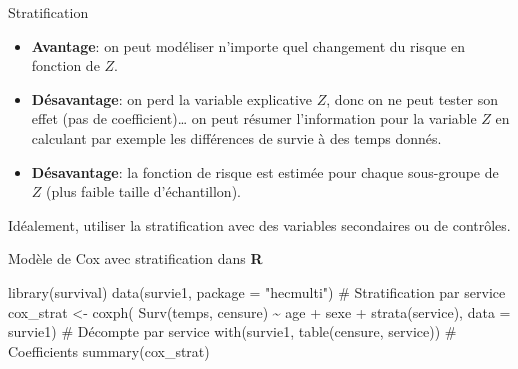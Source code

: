 \documentclass[
  ignorenonframetext,
]{beamer}
\newenvironment{Shaded}{\begin{snugshade}}{\end{snugshade}}
\newcommand{\AttributeTok}[1]{\textcolor[rgb]{0.40,0.45,0.13}{#1}}
\newcommand{\CommentTok}[1]{\textcolor[rgb]{0.37,0.37,0.37}{#1}}
\newcommand{\FunctionTok}[1]{\textcolor[rgb]{0.28,0.35,0.67}{#1}}
\newcommand{\NormalTok}[1]{\textcolor[rgb]{0.00,0.23,0.31}{#1}}
\newcommand{\OtherTok}[1]{\textcolor[rgb]{0.00,0.23,0.31}{#1}}
\newcommand{\SpecialCharTok}[1]{\textcolor[rgb]{0.37,0.37,0.37}{#1}}
\newcommand{\StringTok}[1]{\textcolor[rgb]{0.13,0.47,0.30}{#1}}
\providecommand{\tightlist}{%
  \setlength{\itemsep}{0pt}\setlength{\parskip}{0pt}}
\begin{document}
\begin{frame}{Stratification}
\protect{}\label{stratification}
\begin{itemize}
\tightlist
\item
  \textbf{Avantage}: on peut modéliser n'importe quel changement du
  risque en fonction de \(Z\).
\item
  \textbf{Désavantage}: on perd la variable explicative \(Z\), donc on
  ne peut tester son effet (pas de coefficient)\ldots{} on peut résumer
  l'information pour la variable \(Z\) en calculant par exemple les
  différences de survie à des temps donnés.
\item
  \textbf{Désavantage}: la fonction de risque est estimée pour chaque
  sous-groupe de \(Z\) (plus faible taille d'échantillon).
\end{itemize}

Idéalement, utiliser la stratification avec des variables secondaires ou
de contrôles.
\end{frame}

\begin{frame}[fragile]{Modèle de Cox avec stratification dans
\textbf{R}}
\protect{}\label{moduxe8le-de-cox-avec-stratification-dans-r}
\begin{Shaded}
\begin{Highlighting}[numbers=left,,]
\FunctionTok{library}\NormalTok{(survival)}
\FunctionTok{data}\NormalTok{(survie1, }\AttributeTok{package =} \StringTok{"hecmulti"}\NormalTok{)}
\CommentTok{\# Stratification par service}
\NormalTok{cox\_strat }\OtherTok{\textless{}{-}} \FunctionTok{coxph}\NormalTok{(}
  \FunctionTok{Surv}\NormalTok{(temps, censure) }\SpecialCharTok{\textasciitilde{}}\NormalTok{ age }\SpecialCharTok{+}\NormalTok{ sexe }\SpecialCharTok{+} \FunctionTok{strata}\NormalTok{(service), }
  \AttributeTok{data =}\NormalTok{ survie1)}
\CommentTok{\# Décompte par service}
\FunctionTok{with}\NormalTok{(survie1, }\FunctionTok{table}\NormalTok{(censure, service))}
\CommentTok{\# Coefficients}
\FunctionTok{summary}\NormalTok{(cox\_strat)}
\end{Highlighting}
\end{Shaded}
\end{frame}
\end{document}
